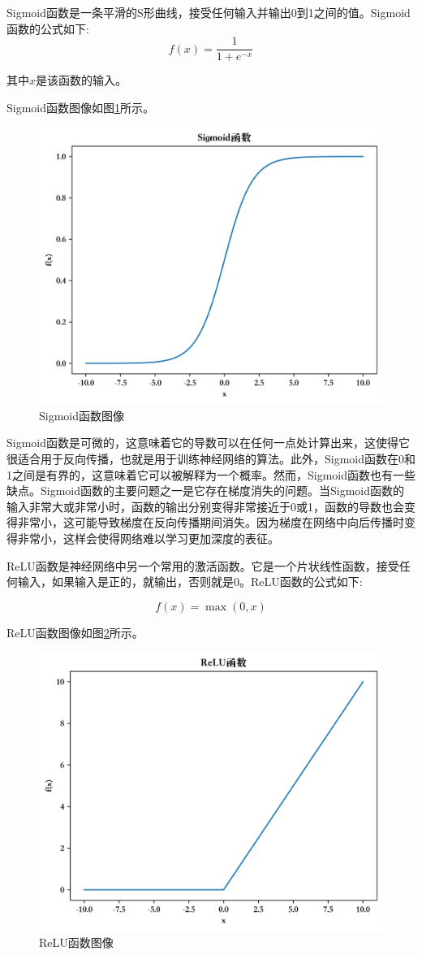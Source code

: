 Sigmoid函数是一条平滑的S形曲线，接受任何输入并输出0到1之间的值。Sigmoid函数的公式如下:
\begin{equation}
\label{eq:2_15}
f(x) = \frac{1} {1 + e^{-x}}
\end{equation}


其中$x$是该函数的输入。

Sigmoid函数图像如图\ref{Sigmoid}所示。
\begin{figure}[htbp]
  \centering
  \includegraphics[width=.65\linewidth]{figures/content/sigmoid.png}
  \caption{Sigmoid函数图像}
  \label{Sigmoid}
\end{figure}


Sigmoid函数是可微的，这意味着它的导数可以在任何一点处计算出来，这使得它很适合用于反向传播，也就是用于训练神经网络的算法。此外，Sigmoid函数在0和1之间是有界的，这意味着它可以被解释为一个概率。然而，Sigmoid函数也有一些缺点。Sigmoid函数的主要问题之一是它存在梯度消失的问题。当Sigmoid函数的输入非常大或非常小时，函数的输出分别变得非常接近于0或1，函数的导数也会变得非常小，这可能导致梯度在反向传播期间消失。因为梯度在网络中向后传播时变得非常小，这样会使得网络难以学习更加深度的表征。


ReLU函数是神经网络中另一个常用的激活函数。它是一个片状线性函数，接受任何输入，如果输入是正的，就输出，否则就是0。ReLU函数的公式如下:

\begin{equation}
\label{eq:2_16}
f(x) = \max(0, x)
\end{equation}

ReLU函数图像如图\ref{ReLU}所示。
\begin{figure}[htbp]
  \centering
  \includegraphics[width=.65\linewidth]{figures/content/ReLU.png}
  \caption{ReLU函数图像}
  \label{ReLU}
\end{figure}

